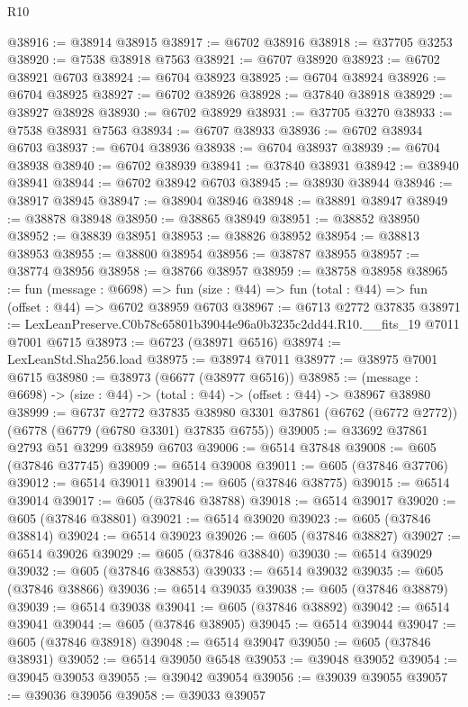 \begin{lexlean}{R10}
\begin{coremodule}
@38916 := @38914 @38915
@38917 := @6702 @38916
@38918 := @37705 @3253
@38920 := @7538 @38918 @7563
@38921 := @6707 @38920
@38923 := @6702 @38921 @6703
@38924 := @6704 @38923
@38925 := @6704 @38924
@38926 := @6704 @38925
@38927 := @6702 @38926
@38928 := @37840 @38918
@38929 := @38927 @38928
@38930 := @6702 @38929
@38931 := @37705 @3270
@38933 := @7538 @38931 @7563
@38934 := @6707 @38933
@38936 := @6702 @38934 @6703
@38937 := @6704 @38936
@38938 := @6704 @38937
@38939 := @6704 @38938
@38940 := @6702 @38939
@38941 := @37840 @38931
@38942 := @38940 @38941
@38944 := @6702 @38942 @6703
@38945 := @38930 @38944
@38946 := @38917 @38945
@38947 := @38904 @38946
@38948 := @38891 @38947
@38949 := @38878 @38948
@38950 := @38865 @38949
@38951 := @38852 @38950
@38952 := @38839 @38951
@38953 := @38826 @38952
@38954 := @38813 @38953
@38955 := @38800 @38954
@38956 := @38787 @38955
@38957 := @38774 @38956
@38958 := @38766 @38957
@38959 := @38758 @38958
@38965 := fun (message : @6698) =>
  fun (size : @44) => fun (total : @44) => fun (offset : @44) => @6702 @38959 @6703
@38967 := @6713 @2772 @37835
@38971 := LexLeanPreserve.C0b78c65801b39044e96a0b3235c2dd44.R10.__fits_19 @7011 @7001 @6715
@38973 := @6723 (@38971 @6516)
@38974 := LexLeanStd.Sha256.load
@38975 := @38974 @7011
@38977 := @38975 @7001 @6715
@38980 := @38973 (@6677 (@38977 @6516))
@38985 := (message : @6698) -> (size : @44) -> (total : @44) -> (offset : @44) -> @38967 @38980
@38999 := @6737
    @2772
    @37835
    @38980
    @3301
    @37861
    (@6762 (@6772 @2772))
    (@6778 (@6779 (@6780 @3301) @37835 @6755))
@39005 := @33692 @37861 @2793 @51 @3299 @38959 @6703
@39006 := @6514 @37848
@39008 := @605 (@37846 @37745)
@39009 := @6514 @39008
@39011 := @605 (@37846 @37706)
@39012 := @6514 @39011
@39014 := @605 (@37846 @38775)
@39015 := @6514 @39014
@39017 := @605 (@37846 @38788)
@39018 := @6514 @39017
@39020 := @605 (@37846 @38801)
@39021 := @6514 @39020
@39023 := @605 (@37846 @38814)
@39024 := @6514 @39023
@39026 := @605 (@37846 @38827)
@39027 := @6514 @39026
@39029 := @605 (@37846 @38840)
@39030 := @6514 @39029
@39032 := @605 (@37846 @38853)
@39033 := @6514 @39032
@39035 := @605 (@37846 @38866)
@39036 := @6514 @39035
@39038 := @605 (@37846 @38879)
@39039 := @6514 @39038
@39041 := @605 (@37846 @38892)
@39042 := @6514 @39041
@39044 := @605 (@37846 @38905)
@39045 := @6514 @39044
@39047 := @605 (@37846 @38918)
@39048 := @6514 @39047
@39050 := @605 (@37846 @38931)
@39052 := @6514 @39050 @6548
@39053 := @39048 @39052
@39054 := @39045 @39053
@39055 := @39042 @39054
@39056 := @39039 @39055
@39057 := @39036 @39056
@39058 := @39033 @39057

\end{coremodule}
\end{lexlean}
